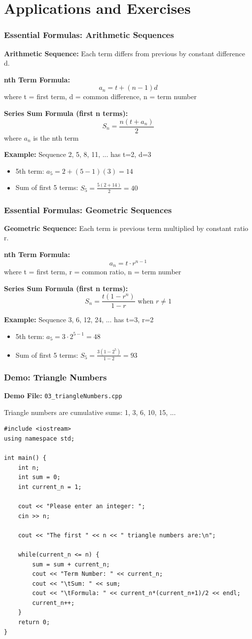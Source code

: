 \documentclass{beamer}
\begin{document}
\section{Applications and Exercises}

\begin{frame}
\frametitle{Essential Formulas: Arithmetic Sequences}
\textbf{Arithmetic Sequence:} Each term differs from previous by constant difference d.

\textbf{nth Term Formula:}
$$a_n = t + (n-1)d$$
where t = first term, d = common difference, n = term number

\textbf{Series Sum Formula (first n terms):}
$$S_n = \frac{n(t + a_n)}{2}$$
where $a_n$ is the nth term

\textbf{Example:} Sequence 2, 5, 8, 11, ... has t=2, d=3
\begin{itemize}
\item 5th term: $a_5 = 2 + (5-1)(3) = 14$
\pause
\item Sum of first 5 terms: $S_5 = \frac{5(2+14)}{2} = 40$
\end{itemize}
\end{frame}

\begin{frame}
\frametitle{Essential Formulas: Geometric Sequences}
\textbf{Geometric Sequence:} Each term is previous term multiplied by constant ratio r.

\textbf{nth Term Formula:}
$$a_n = t \cdot r^{n-1}$$
where t = first term, r = common ratio, n = term number

\textbf{Series Sum Formula (first n terms):}
$$S_n = \frac{t(1-r^n)}{1-r} \text{ when } r \neq 1$$

\textbf{Example:} Sequence 3, 6, 12, 24, ... has t=3, r=2
\begin{itemize}
\item 5th term: $a_5 = 3 \cdot 2^{5-1} = 48$
\pause
\item Sum of first 5 terms: $S_5 = \frac{3(1-2^5)}{1-2} = 93$
\end{itemize}
\end{frame}

\begin{frame}[fragile]
\frametitle{Demo: Triangle Numbers}
\textbf{Demo File:} \texttt{03\_triangleNumbers.cpp}

Triangle numbers are cumulative sums: 1, 3, 6, 10, 15, ...

\begin{verbatim}
#include <iostream>
using namespace std;

int main() {
    int n;
    int sum = 0;
    int current_n = 1;
    
    cout << "Please enter an integer: ";
    cin >> n;
    
    cout << "The first " << n << " triangle numbers are:\n";
    
    while(current_n <= n) {
        sum = sum + current_n;
        cout << "Term Number: " << current_n;
        cout << "\tSum: " << sum;
        cout << "\tFormula: " << current_n*(current_n+1)/2 << endl;
        current_n++;
    }
    return 0;
}
\end{verbatim}
\end{frame}
\end{document}
